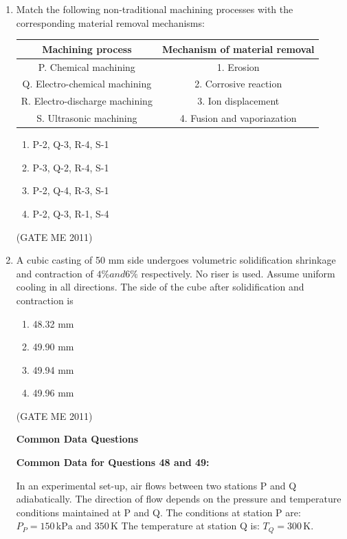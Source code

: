\documentclass[journal]{IEEEtran}
\begin{document}
\begin{enumerate}
\item Match the following non-traditional machining processes with the corresponding material removal mechanisms:

\begin{tabular}{|c|c|}
\hline
Machining process              & Mechanism of material removal \\
\hline
P. Chemical machining          & 1. Erosion \\
\hline
Q. Electro-chemical machining  & 2. Corrosive reaction \\
\hline
R. Electro-discharge machining & 3. Ion displacement \\
\hline
S. Ultrasonic machining        & 4. Fusion and vaporiazation \\
\hline
\end{tabular}

\begin{multicols}{2}
\begin{enumerate}
\item P-2, Q-3, R-4, S-1
\item P-3, Q-2, R-4, S-1
\item P-2, Q-4, R-3, S-1
\item P-2, Q-3, R-1, S-4
\end{enumerate}
\end{multicols}   
\hfill (GATE ME 2011)

\item A cubic casting of 50 mm side undergoes volumetric solidification shrinkage and contraction of $4\% and 6\% $ respectively. No riser is used. Assume uniform cooling in all directions. The side of the cube after solidification and contraction is
\begin{multicols}{4}
\begin{enumerate}
\item 48.32 mm
\item 49.90 mm
\item 49.94 mm
\item 49.96 mm
\end{enumerate}
\end{multicols}   
\hfill (GATE ME 2011)

\textbf{Common Data Questions}

\textbf{Common Data for Questions 48 and 49:} 

In an experimental set-up, air flows between two stations P and Q adiabatically. The direction of flow depends on the pressure and temperature conditions maintained at P and Q.  
The conditions at station P are:  
$P_P = 150\,\text{kPa} $ and $350\,\text{K}$  
The temperature at station Q is:  
$T_Q = 300\,\text{K}$.


\end{enumerate}
\end{document}
